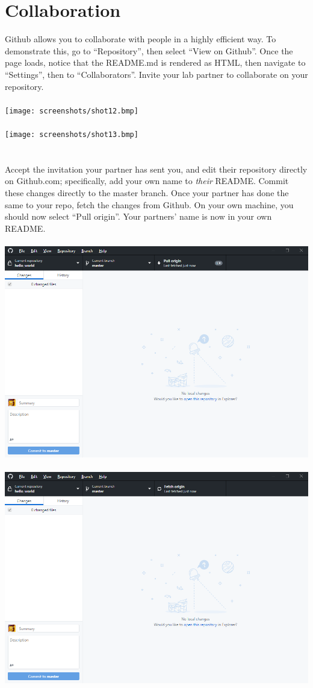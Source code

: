 \documentclass[12pt, letter]{article}
\begin{document}
    \section{Collaboration}
    Github allows you to collaborate with people in a highly efficient way. To demonstrate this, go to ``Repository'', then select ``View on Github''. Once the page loads, notice that the README.md is rendered as HTML, then navigate to ``Settings'', then to ``Collaborators''. Invite your lab partner to collaborate on your repository. \\ \\ %
    \texttt{[image: screenshots/shot12.bmp]} \\ \\
    \texttt{[image: screenshots/shot13.bmp]}
    \\ \\ \\
    Accept the invitation your partner has sent you, and edit their repository directly on Github.com; specifically, add your own name to \emph{their} README. Commit these changes directly to the master branch. Once your partner has done the same to your repo, fetch the changes from Github. On your own machine, you should now select ``Pull origin''. Your partners' name is now in your own README. \\ \\ %
    \includegraphics{screenshots/shot14.bmp} \\ \\
    \includegraphics{screenshots/shot15.bmp}
\end{document}
